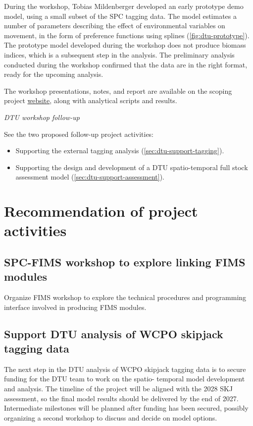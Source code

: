 \documentclass{SCreport}
\newcommand\tree
{https://github.com/PacificCommunity/ofp-sam-transition-plan/tree/main}
\begin{document}
During the workshop, Tobias Mildenberger developed an early prototype demo
model, using a small subset of the SPC tagging data. The model estimates a
number of parameters describing the effect of environmental variables on
movement, in the form of preference functions using splines
(\autoref{fig:dtu-prototype}). The prototype model developed during the workshop
does not produce biomass indices, which is a subsequent step in the analysis.
The preliminary analysis conducted during the workshop confirmed that the data
are in the right format, ready for the upcoming analysis.

The workshop presentations, notes, and report are available on the scoping
project \href{\tree/workshops/2025-05-copenhagen}{website}, along with
analytical scripts and results.

\vspace{2ex}

\textit{DTU workshop follow-up}

See the two proposed follow-up project activities:

\begin{itemize}
  \item Supporting the external tagging analysis
  (\autoref{sec:dtu-support-tagging}).
  \item Supporting the design and development of a DTU spatio-temporal full
  stock assessment model (\autoref{sec:dtu-support-assessment}).
\end{itemize}

\section{Recommendation of project activities}

\subsection{SPC-FIMS workshop to explore linking FIMS modules}
\label{sec:fims-workshop}

Organize FIMS workshop to explore the technical procedures and programming
interface involved in producing FIMS modules.

\subsection{Support DTU analysis of WCPO skipjack tagging data}
\label{sec:dtu-support-tagging}

The next step in the DTU analysis of WCPO skipjack tagging data is to secure
funding for the DTU team to work on the spatio- temporal model development and
analysis. The timeline of the project will be aligned with the 2028 SKJ
assessment, so the final model results should be delivered by the end of 2027.
Intermediate milestones will be planned after funding has been secured, possibly
organizing a second workshop to discuss and decide on model options.
\end{document}
